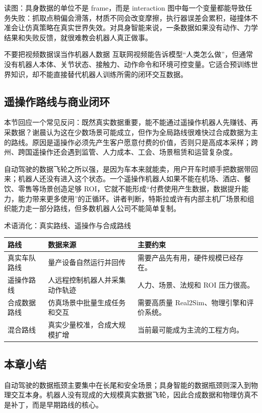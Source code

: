 \begin{knowledgebox}{读图：具身数据的单位不是 frame，而是 interaction}
图中每一个变量都能导致任务失败：抓取点稍偏会滑落，材质不同会改变摩擦，执行器误差会累积，碰撞体不准会让仿真策略在真实世界失效。对具身智能来说，一条数据如果没有动作、力学结果和失败反馈，就很难教会机器人真正做事。
\end{knowledgebox}

\begin{warningbox}{不要把视频数据误当作机器人数据}
互联网视频能告诉模型“人类怎么做”，但通常没有机器人本体、关节状态、接触力、动作命令和环境可控变量。它适合预训练世界知识，却不能直接替代机器人训练所需的闭环交互数据。
\end{warningbox}

\subsection{遥操作路线与商业闭环}

本节回应一个常见反问：既然真实数据重要，能不能通过遥操作机器人先赚钱、再采数据？谢晨认为这在少数场景可能成立，但作为全局路线很难快过合成数据为主的路线。原因是遥操作必须先产生客户愿意付费的价值，否则只是高成本采样；跨州、跨国遥操作还会遇到监管、人力成本、工会、场景租赁和运营复杂度。

自动驾驶的数据飞轮之所以强，是因为车本来就能卖，用户开车时顺手把数据带回来；机器人还没有进入这个状态。一个遥操作机器人如果不能在机场、酒店、餐饮、零售等场景创造足够 ROI，它就不能形成“付费使用产生数据，数据提升能力，能力带来更多使用”的正循环。讲者判断，特斯拉或许有内部主机厂场景和组织能力走一部分路线，但多数机器人公司不能简单复制。

\begin{knowledgebox}{术语消化：真实路线、遥操作与合成路线}
\begin{tabularx}{\textwidth}{p{}p{}X}
\toprule
路线 & 数据来源 & 主要约束 \\
\midrule
真实车队路线 & 量产设备自然运行并回传 & 需要产品先有用，硬件规模已经存在。 \\
遥操作路线 & 人远程控制机器人并采集动作轨迹 & 人力、场景、法规和 ROI 压力很高。 \\
合成数据路线 & 仿真场景中批量生成任务和交互 & 需要高质量 Real2Sim、物理引擎和评价系统。 \\
混合路线 & 真实少量校准，合成大规模扩增 & 当前最可能成为主流的工程方向。 \\
\bottomrule
\end{tabularx}
\end{knowledgebox}

\subsection{本章小结}

自动驾驶的数据瓶颈主要集中在长尾和安全场景；具身智能的数据瓶颈则深入到物理交互本身。机器人没有现成的大规模真实数据飞轮，因此合成数据和物理仿真不是补丁，而是早期路线的核心。

